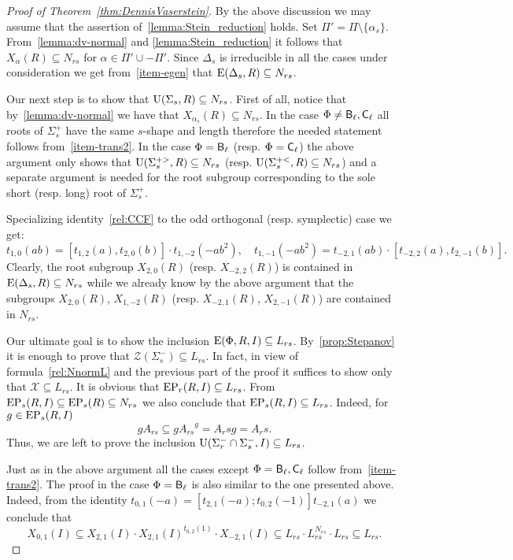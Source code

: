 \begin{proof}[Proof of Theorem~\ref{thm:DennisVaserstein}]
By the above discussion we may assume that the assertion of~\cref{lemma:Stein_reduction} holds.
Set $\Pi' = \Pi \setminus \{\alpha_s\}$.
From~\cref{lemma:dv-normal} and \cref{lemma:Stein_reduction} it follows that $X_\alpha(R) \subseteq N_{rs}$ for $\alpha \in \Pi' \cup -\Pi'$.
Since $\Delta_s$ is irreducible in all the cases under consideration we get from~\cref{item-egen} that $\operatorname{E}(\Delta_s, R) \subseteq N_{rs}$.

Our next step is to show that $\operatorname{U}(\Sigma_s, R) \subseteq N_{rs}$.
First of all, notice that by~\cref{lemma:dv-normal} we have that $X_{\alpha_s}(R) \subseteq N_{rs}$.
In the case $\Phi\neq \mathsf{B}_\ell, \mathsf{C}_\ell$ all roots of $\Sigma^+_s$ have the same $s$-shape and length therefore the needed statement follows from~\cref{item-trans2}.
In the case $\Phi=\mathsf{B}_\ell$ (resp. $\Phi=\mathsf{C}_\ell$) the above argument only shows that $\operatorname{U}(\Sigma_s^{+>}, R) \subseteq N_{rs}$ (resp. $\operatorname{U}(\Sigma_s^{+<}, R) \subseteq N_{rs}$)
and a separate argument is needed for the root subgroup corresponding to the sole short (resp. long) root of $\Sigma_s^+$.
 
Specializing identity~\eqref{rel:CCF} to the odd orthogonal (resp. symplectic) case we get:
\begin{equation} \label{rel:CCF-specBC} t_{1,0}(ab) = [t_{1, 2}(a), t_{2, 0}(b)] \cdot t_{1,-2}(-a b^2), \quad t_{1,-1}(-ab^2) = t_{-2,1}(ab) \cdot [t_{-2, 2}(a), t_{2, -1}(b)]. \end{equation}
Clearly, the root subgroup $X_{2, 0}(R)$ (resp. $X_{-2,2}(R)$) is contained in $\operatorname{E}(\Delta_s, R) \subseteq N_{rs}$ while we already know by the above argument that the subgroups $X_{2, 0}(R)$, $X_{1,-2}(R)$
(resp. $X_{-2,1}(R)$, $X_{2,-1}(R)$) are contained in $N_{rs}$.

Our ultimate goal is to show the inclusion $\operatorname{E}(\Phi, R, I) \subseteq L_{rs}$. 
By~\cref{prop:Stepanov} it is enough to prove that $\mathcal{Z}(\Sigma^-_s) \subseteq L_{rs}$.
In fact, in view of formula~\eqref{rel:NnormL} and the previous part of the proof it suffices to show only that $\mathcal{X} \subseteq L_{rs}$.
It is obvious that $\operatorname{EP}_r(R, I) \subseteq L_{rs}$.
From $\operatorname{EP}_s(R, I) \subseteq \operatorname{EP}_s(R) \subseteq N_{rs}$ we also conclude that $\operatorname{EP}_s(R, I) \subseteq L_{rs}$. Indeed, for $g\in\operatorname{EP}_s(R,I)$
\[ gA_{rs} \subseteq g {A_{rs}}^g = A_rs g = A_rs. \]
Thus, we are left to prove the inclusion $\operatorname{U}(\Sigma^-_r \cap \Sigma^-_s, I) \subseteq L_{rs}$.

Just as in the above argument all the cases except $\Phi = \mathsf{B}_\ell, \mathsf{C}_\ell$ follow from~\cref{item-trans2}.
The proof in the case $\Phi=\mathsf{B}_\ell$ is also similar to the one presented above.
Indeed, from the identity $t_{0, 1}(-a) = [t_{2,1}(-a); t_{0, 2}(-1)] t_{-2,1}(a)$ we conclude that
$$X_{0,1}(I) \subseteq X_{2,1}(I) \cdot X_{2,1}(I)^{t_{0,2}(1)} \cdot X_{-2,1}(I) \subseteq L_{rs} \cdot L_{rs}^{N_{rs}} \cdot L_{rs} \subseteq L_{rs}.$$

\end{proof}

